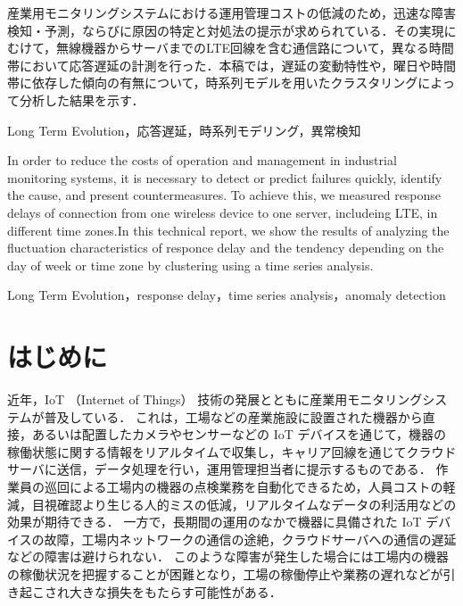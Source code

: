 \documentclass[technicalreport]{ieicej}
\begin{document}
\newcommand{\argmin}{\mathop{\rm arg~min}\limits}
\def \vector#1{\mbox{\boldmath $#1$}}

\begin{jabstract}
産業用モニタリングシステムにおける運用管理コストの低減のため，迅速な障害検知・予測，ならびに原因の特定と対処法の提示が求められている．その実現にむけて，無線機器からサーバまでのLTE回線を含む通信路について，異なる時間帯において応答遅延の計測を行った．本稿では，遅延の変動特性や，曜日や時間帯に依存した傾向の有無について，時系列モデルを用いたクラスタリングによって分析した結果を示す．
\end{jabstract}
\begin{jkeyword}
Long Term Evolution，応答遅延，時系列モデリング，異常検知
\end{jkeyword}
\begin{eabstract}
In order to reduce the costs of operation and management in industrial monitoring systems, it is necessary to detect or predict failures quickly, identify the cause, and present countermeasures. To achieve this, we measured response delays of connection from one wireless device to one server, includeing LTE, in different time zones.In this technical report, we show the results of analyzing the fluctuation characteristics of responce delay and the tendency depending on the day of week or time zone by clustering using a time series analysis.
\end{eabstract}
\begin{ekeyword}
Long Term Evolution，response delay，time series analysis，anomaly detection
\end{ekeyword}
\maketitle

\section{はじめに}
近年，IoT （Internet of Things） 技術の発展とともに産業用モニタリングシステム\cite{monitering}が普及している．
これは，工場などの産業施設に設置された機器から直接，あるいは配置したカメラやセンサーなどの IoT デバイスを通じて，機器の稼働状態に関する情報をリアルタイムで収集し，キャリア回線を通じてクラウドサーバに送信，データ処理を行い，運用管理担当者に提示するものである．
作業員の巡回による工場内の機器の点検業務を自動化できるため，人員コストの軽減，目視確認より生じる人的ミスの低減，リアルタイムなデータの利活用などの効果が期待できる．
一方で，長期間の運用のなかで機器に具備された IoT デバイスの故障，工場内ネットワークの通信の途絶，クラウドサーバへの通信の遅延などの障害は避けられない．
このような障害が発生した場合には工場内の機器の稼働状況を把握することが困難となり，工場の稼働停止や業務の遅れなどが引き起こされ大きな損失をもたらす可能性がある．
\end{document}
